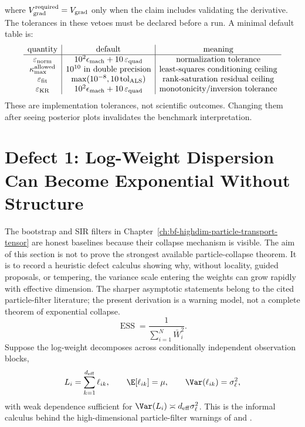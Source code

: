 where \(V_{\rm grad}^{\rm required}=V_{\rm grad}\) only when the claim includes
validating the derivative.  The tolerances in these vetoes must be declared
before a run.  A minimal default table is:
\begin{equation}
\begin{array}{c|c|c}
\text{quantity} & \text{default} & \text{meaning}\\
\hline
\varepsilon_{\rm norm} & 10^2\epsilon_{\rm mach}+10\,\varepsilon_{\rm quad} & \text{normalization tolerance}\\
\kappa_{\rm max}^{\rm allowed} & 10^{10}\ \text{in double precision} & \text{least-squares conditioning ceiling}\\
\varepsilon_{\rm fit} & \max(10^{-8},10\,{\rm tol}_{\rm ALS}) & \text{rank-saturation residual ceiling}\\
\varepsilon_{\rm KR} & 10^2\epsilon_{\rm mach}+10\,\varepsilon_{\rm quad} & \text{monotonicity/inversion tolerance}
\end{array}
  \label{eq:bf-hd-veto-defaults}
\end{equation}
These are implementation tolerances, not scientific outcomes.  Changing them
after seeing posterior plots invalidates the benchmark interpretation.

\section[Particle Collapse]{Defect 1: Log-Weight Dispersion Can Become Exponential Without Structure}
\label{sec:bf-hd-defect-particles}

The bootstrap and SIR filters in Chapter~\ref{ch:bf-highdim-particle-transport-tensor}
are honest baselines because their collapse mechanism is visible.  The aim of
this section is not to prove the strongest available particle-collapse theorem.
It is to record a heuristic defect calculus showing why, without locality,
guided proposals, or tempering, the variance scale entering the weights can grow
rapidly with effective dimension.  The sharper asymptotic statements belong to
the cited particle-filter literature; the present derivation is a warning model,
not a complete theorem of exponential collapse.
\begin{equation}
  \operatorname{ESS}=\frac{1}{\sum_{i=1}^N \bar W_i^2}.
  \label{eq:bf-hd-synth-ess}
\end{equation}
Suppose the log-weight decomposes across conditionally independent observation
blocks,
\begin{equation}
  L_i=\sum_{k=1}^{d_{\mathrm{eff}}} \ell_{ik},\qquad
  \E[\ell_{ik}]=\mu,\qquad \Var(\ell_{ik})=\sigma_\ell^2,
  \label{eq:bf-hd-synth-logweight}
\end{equation}
with weak dependence sufficient for
\(\Var(L_i)\asymp d_{\mathrm{eff}}\sigma_\ell^2\).  This is the informal
calculus behind the high-dimensional particle-filter warnings of
\citet{bengtsson2008curse} and \citet{snyder2008obstacles}.

